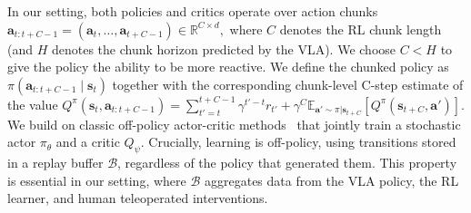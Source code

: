 In our setting, both policies and critics operate over action chunks
$
\mathbf{a}_{t:t+C-1} = (\mathbf{a}_t, \dots, \mathbf{a}_{t+C-1}) \in \mathbb{R}^{C \times d},
$
where $C$ denotes the RL chunk length (and $H$ denotes the chunk horizon predicted by the VLA). We choose $C < H$ to give the policy the ability to be more reactive. We define the chunked policy as $\pi(\mathbf{a}_{t:t+C-1} \mid \mathbf{s}_t)$ together with the corresponding chunk-level C-step estimate of the value
$
Q^\pi(\mathbf{s}_{t}, \mathbf{a}_{t:t+C-1}) = \sum_{t'=t}^{t+C-1} \gamma^{t'-t} r_{t'} + \gamma^C \mathbb{E}_{\mathbf{a}' \sim \pi | \mathbf{s}_{t+C}} \left[ Q^\pi(\mathbf{s}_{t+C}, \mathbf{a}') \right].
$
We build on classic off-policy actor-critic methods~\citep{heesssvg,haarnoja2018soft,fujimoto2018td3} that jointly train a stochastic actor $\pi_\theta$ and a critic $Q_\psi$. Crucially, learning is off-policy, using transitions stored in a replay buffer $\mathcal{B}$, regardless of the policy that generated them. This property is essential in our setting, where $\mathcal{B}$ aggregates data from the VLA policy, the RL learner, and human teleoperated interventions.